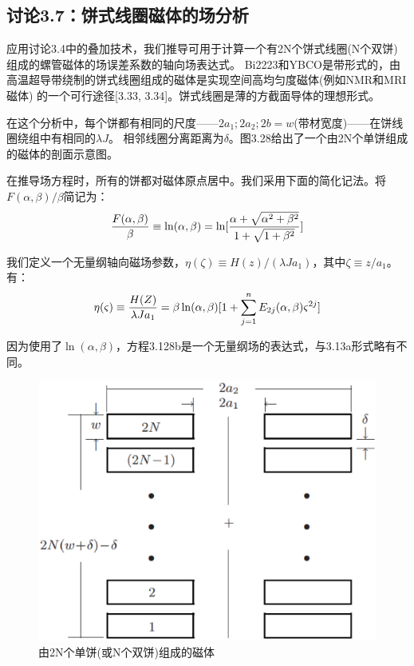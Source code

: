\subsection{讨论3.7：饼式线圈磁体的场分析}
应用讨论3.4中的叠加技术，我们推导可用于计算一个有2N个饼式线圈(N个双饼)组成的螺管磁体的场误差系数的轴向场表达式。
Bi2223和YBCO是带形式的，由高温超导带绕制的饼式线圈组成的磁体是实现空间高均匀度磁体(例如NMR和MRI磁体)
的一个可行途径[3.33, 3.34]。饼式线圈是薄的方截面导体的理想形式。

在这个分析中，每个饼都有相同的尺度——$2a_1;2a_2;2b=w$(带材宽度)——在饼线圈绕组中有相同的$\lambda J$。
相邻线圈分离距离为$\delta$。图3.28给出了一个由2N个单饼组成的磁体的剖面示意图。

在推导场方程时，所有的饼都对磁体原点居中。我们采用下面的简化记法。将$F(\alpha,\beta)/{\beta}$简记为：
\begin{equation}
\frac{F(\alpha,\beta)}{\beta}\equiv \ln(\alpha,\beta)=\ln[\frac{\alpha+\sqrt{\alpha^2+\beta^2}}{1+\sqrt{1+\beta^2}}]\\%
\end{equation}

我们定义一个无量纲轴向磁场参数，$\eta(\zeta)\equiv H(z)/(\lambda J a_1)$，其中$\zeta\equiv z/a_1$。有：
\begin{equation}
\eta(\varsigma)\equiv \frac{H(Z)}{\lambda Ja_{1}}=\beta \ln(\alpha,\beta)[1+\sum_{j=1}^{n} E_{2j}(\alpha,\beta)\varsigma^{2j}]\\%
\end{equation}

因为使用了$\ln(\alpha,\beta)$，方程3.128b是一个无量纲场的表达式，与3.13a形式略有不同。
\begin{figure}[htbp]
	\centering
	\includegraphics[scale=0.4]{chpt3/figs/fig3.28.eps}
	\caption{由2N个单饼(或N个双饼)组成的磁体}
\end{figure}

